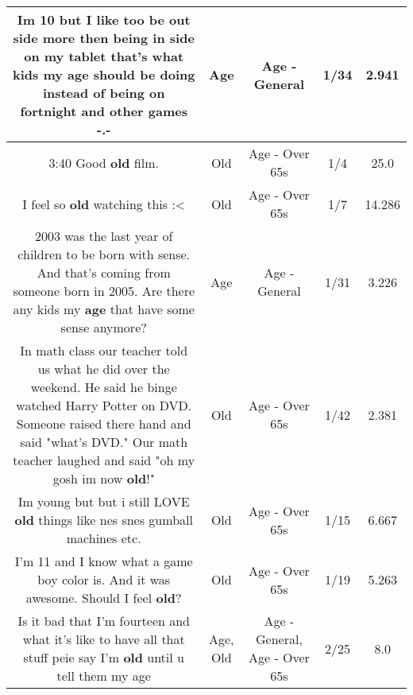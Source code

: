 \documentclass[11pt]{article}
\newlength\mylength
\begin{document}
\begin{center}
\begin{longtable}{|C{.65\mylength}|C{.30\mylength}|C{.12\mylength}|C{.12\mylength}|C{.12\mylength}|}
  \small Im 10 but I like too be out side more then being in side on my tablet that's what kids my \textbf{age} should be doing instead of being on fortnight and other games -.-\normalsize   & Age & Age - General & 1/34 & 2.941 \\  \hline
  \small 3:40 Good \textbf{old} film.\normalsize   & Old & Age - Over 65s & 1/4 & 25.0 \\  \hline
  \small I feel so \textbf{old} watching this :<\normalsize   & Old & Age - Over 65s & 1/7 & 14.286 \\  \hline
  \small 2003 was the last year of children to be born with sense. And that's coming from someone born in 2005. Are there any kids my \textbf{age} that have some sense anymore?\normalsize   & Age & Age - General & 1/31 & 3.226 \\  \hline
  \small In math class our teacher told us what he did over the weekend. He said he binge watched Harry Potter on DVD. Someone raised there hand and said "what's DVD." Our math teacher laughed and said "oh my gosh im now \textbf{old}!"\normalsize   & Old & Age - Over 65s & 1/42 & 2.381 \\  \hline
  \small Im young but but i still LOVE \textbf{old} things like nes snes gumball machines etc.\normalsize   & Old & Age - Over 65s & 1/15 & 6.667 \\  \hline
  \small I'm 11 and I know what a game boy color is. And it was awesome. Should I feel \textbf{old}?\normalsize   & Old & Age - Over 65s & 1/19 & 5.263 \\  \hline
  \small Is it bad that I'm fourteen and what it's like to have all that stuff peie say I'm \textbf{old} until u tell them my age\normalsize   & Age, Old & Age - General, Age - Over 65s & 2/25 & 8.0 \\  \hline

\end{longtable}
\end{center}
\end{document}
